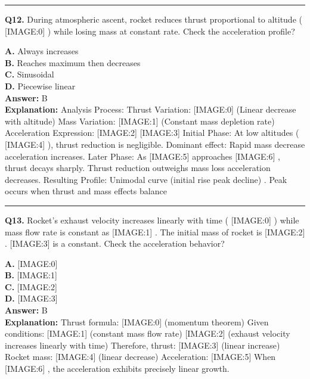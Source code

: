 \documentclass[12pt]{article}
\begin{document}
\hrule
\vspace{1em}


\noindent
\textbf{Q12.} During atmospheric ascent, rocket reduces thrust proportional to altitude (
[IMAGE:0]
) while losing mass at constant rate.
Check the acceleration profile?



\textbf{A.} Always increases \\
\textbf{B.} Reaches maximum then decreases \\
\textbf{C.} Sinusoidal \\
\textbf{D.} Piecewise linear \\

\textbf{Answer:} B \\
\textbf{Explanation:} Analysis Process:
Thrust Variation:
[IMAGE:0]
(Linear decrease with altitude)
Mass Variation:
[IMAGE:1]
(Constant mass depletion rate)
Acceleration Expression:
[IMAGE:2]
[IMAGE:3]
Initial Phase: At low altitudes (
[IMAGE:4]
), thrust reduction is negligible. Dominant effect: Rapid mass decrease \to  acceleration increases.
Later Phase: As
[IMAGE:5]
approaches
[IMAGE:6]
, thrust decays sharply. Thrust reduction outweighs mass loss \to  acceleration decreases.
Resulting Profile: Unimodal curve (initial rise \to  peak \to  decline) . Peak occurs when thrust and mass effects balance

\hrule
\vspace{1em}


\noindent
\textbf{Q13.} Rocket's exhaust velocity increases linearly with time (
[IMAGE:0]
) while mass flow rate is constant as
[IMAGE:1]
. The initial mass of rocket is
[IMAGE:2]
.
[IMAGE:3]
is a constant.
Check the acceleration behavior?



\textbf{A.} [IMAGE:0] \\
\textbf{B.} [IMAGE:1] \\
\textbf{C.} [IMAGE:2] \\
\textbf{D.} [IMAGE:3] \\

\textbf{Answer:} B \\
\textbf{Explanation:} Thrust formula:
[IMAGE:0]
(momentum theorem)
Given conditions:
[IMAGE:1]
(constant mass flow rate)
[IMAGE:2]
(exhaust velocity increases linearly with time)
Therefore, thrust:
[IMAGE:3]
(linear increase)
Rocket mass:
[IMAGE:4]
(linear decrease)
Acceleration:
[IMAGE:5]
When
[IMAGE:6]
, the acceleration exhibits precisely linear growth.
\end{document}
